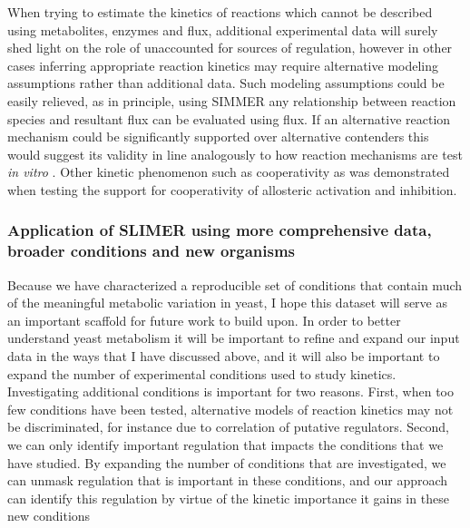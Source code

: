 When trying to estimate the kinetics of reactions which cannot be described using metabolites, enzymes and flux, additional experimental data will surely shed light on the role of unaccounted for sources of regulation, however in other cases inferring appropriate reaction kinetics may require alternative modeling assumptions rather than additional data. Such modeling assumptions could be easily relieved, as in principle, using SIMMER any relationship between reaction species and resultant flux can be evaluated using flux. If an alternative reaction mechanism could be significantly supported over alternative contenders this would suggest its validity in line analogously to how reaction mechanisms are test \textit{in vitro} \cite{CornishBowden:2012wb}. Other kinetic phenomenon such as cooperativity \cite{Hill:1910vo, Bush:2012jf} as was demonstrated when testing the support for cooperativity of allosteric activation and inhibition. 

\subsubsection{Application of SLIMER using more comprehensive data, broader conditions and new organisms}

Because we have characterized a reproducible set of conditions that contain much of the meaningful metabolic variation in yeast, I hope this dataset will serve as an important scaffold for future work to build upon.  In order to better understand yeast metabolism it will be important to refine and expand our input data in the ways that I have discussed above, and it will also be important to expand the number of experimental conditions used to study kinetics. Investigating additional conditions is important for two reasons. First, when too few conditions have been tested, alternative models of reaction kinetics may not be discriminated, for instance due to correlation of putative regulators. Second, we can only identify important regulation that impacts the conditions that we have studied. By expanding the number of conditions that are investigated, we can unmask regulation that is important in these conditions, and our approach can identify this regulation by virtue of the kinetic importance it gains in these new conditions


